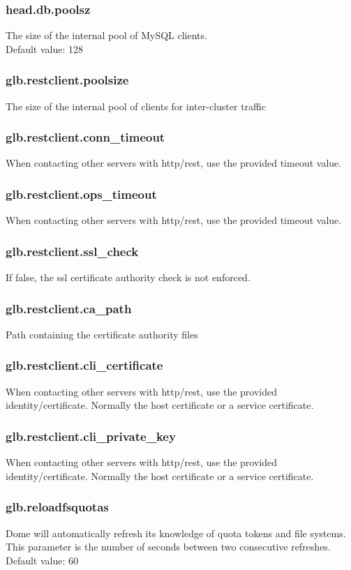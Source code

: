 \documentclass[a4paper,10pt]{scrreprt}
\begin{document}
\subsubsection{head.db.poolsz}
The size of the internal pool of MySQL clients.\\
Default value: 128\\

\subsubsection{glb.restclient.poolsize}
The size of the internal pool of clients for inter-cluster traffic
\subsubsection{glb.restclient.conn\_timeout}
When contacting other servers with http/rest, use the provided timeout value.
\subsubsection{glb.restclient.ops\_timeout}
When contacting other servers with http/rest, use the provided timeout value.
\subsubsection{glb.restclient.ssl\_check}
If false, the ssl certificate authority check is not enforced.
\subsubsection{glb.restclient.ca\_path}
Path containing the certificate authority files
\subsubsection{glb.restclient.cli\_certificate}
When contacting other servers with http/rest, use the provided identity/certificate. Normally the host certificate or a service certificate.
\subsubsection{glb.restclient.cli\_private\_key}
When contacting other servers with http/rest, use the provided identity/certificate. Normally the host certificate or a service certificate.


\subsubsection{glb.reloadfsquotas}
Dome will automatically refresh its knowledge of quota tokens and file systems. This parameter is the number of seconds between two consecutive refreshes.\\
Default value: 60\\
\end{document}

